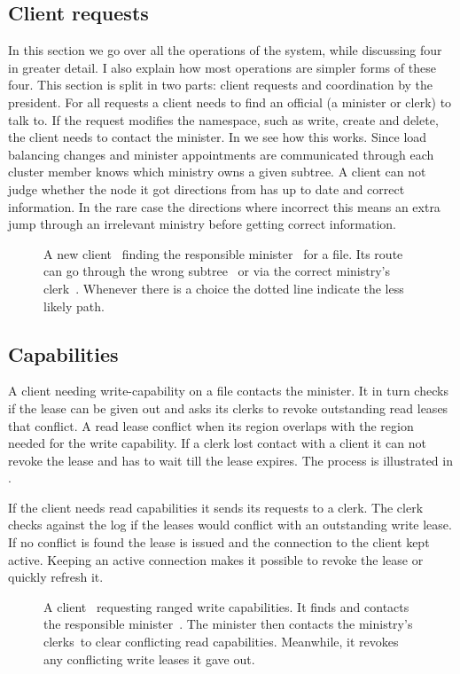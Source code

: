 \subsection{Client requests} %
In this section we go over all the operations of the system, while discussing four in greater detail. I also explain how most operations are simpler forms of these four. This section is split in two parts: client requests and coordination by the president.
%
For all requests a client needs to find an official (a minister or clerk) to talk to. If the request modifies the namespace, such as write, create and delete, the client needs to contact the minister. In  we see how this works. Since load balancing changes and minister appointments are communicated through \raft{} each cluster member knows which ministry owns a given subtree. A client can not judge whether the node it got directions from has up to date and correct information. In the rare case the directions where incorrect this means an extra jump through an irrelevant ministry before getting correct information.
%
\begin{figure}[htbp]
	\centering
	
	\caption{A new client~\clientLeg{} finding the responsible minister~\amdsLeg{} for a file. Its route can go through the wrong subtree~\umdsLeg{} or via the correct ministry's clerk~\cmdsLeg{}. Whenever there is a choice the dotted line indicate the less likely path.}
	\label{fig:find_aMDS}
\end{figure}
%
\subsection*{Capabilities} 
A client needing write-capability on a file contacts the minister. It in turn checks if the lease can be given out and asks its clerks to revoke outstanding read leases that conflict. A read lease conflict when its region overlaps with the region needed for the write capability. If a clerk lost contact with a client it can not revoke the lease and has to wait till the lease expires. The process is illustrated in . 

If the client needs read capabilities it sends its requests to a clerk. The clerk checks against the \raft{} log if the leases would conflict with an outstanding write lease. If no conflict is found the lease is issued and the connection to the client kept active. Keeping an active connection makes it possible to revoke the lease or quickly refresh it.
%
\begin{figure}[htbp]
	\centering
	
	\caption{A client~\clientLeg{} requesting ranged write capabilities. It finds and contacts the responsible minister~\amdsLeg{}. The minister then contacts the ministry's clerks~\cmdsLeg to clear conflicting read capabilities. Meanwhile, it revokes any conflicting write leases it gave out.}
	\label{fig:write}
\end{figure}
%
